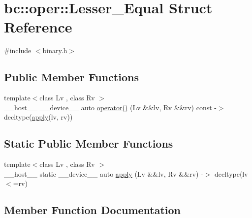 \hypertarget{structbc_1_1oper_1_1Lesser__Equal}{}\section{bc\+:\+:oper\+:\+:Lesser\+\_\+\+Equal Struct Reference}
\label{structbc_1_1oper_1_1Lesser__Equal}


{\ttfamily \#include $<$binary.\+h$>$}

\subsection*{Public Member Functions}
\begin{DoxyCompactItemize}
\item 
{\footnotesize template$<$class Lv , class Rv $>$ }\\\+\_\+\+\_\+host\+\_\+\+\_\+ \+\_\+\+\_\+device\+\_\+\+\_\+ auto \hyperlink{structbc_1_1oper_1_1Lesser__Equal_a53199452a7d5481ee4d6900927204a1c}{operator()} (Lv \&\&lv, Rv \&\&rv) const -\/$>$ decltype(\hyperlink{structbc_1_1oper_1_1Lesser__Equal_a2c49858872ba6a7243b0b645384c958e}{apply}(lv, rv))
\end{DoxyCompactItemize}
\subsection*{Static Public Member Functions}
\begin{DoxyCompactItemize}
\item 
{\footnotesize template$<$class Lv , class Rv $>$ }\\\+\_\+\+\_\+host\+\_\+\+\_\+ static \+\_\+\+\_\+device\+\_\+\+\_\+ auto \hyperlink{structbc_1_1oper_1_1Lesser__Equal_a2c49858872ba6a7243b0b645384c958e}{apply} (Lv \&\&lv, Rv \&\&rv) -\/$>$ decltype(lv$<$=rv)
\end{DoxyCompactItemize}


\subsection{Member Function Documentation}
\mbox{\label{structbc_1_1oper_1_1Lesser__Equal_a2c49858872ba6a7243b0b645384c958e}} 
